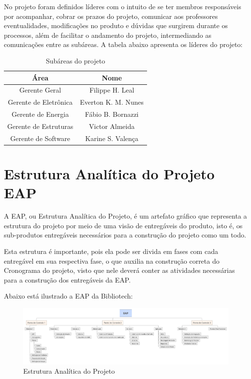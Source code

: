 No projeto foram definidos líderes com o intuito de se ter membros responsáveis por acompanhar, cobrar os prazos do projeto, comunicar aos professores eventualidades, modificações no produto e dúvidas que surgirem durante os processos, além de facilitar o andamento do projeto, intermediando as comunicações entre as subáreas. A tabela abaixo apresenta os líderes do projeto:

\begin{table}[h]
\caption{Subáreas do projeto}
\centering
\begin{tabular}{|c|c|} \hline
\textbf{Área} & \textbf{Nome}\\ \hline                               
Gerente Geral & Filippe H. Leal\\ \hline
Gerente de Eletrônica & Everton K. M. Nunes\\ \hline
Gerente de Energia & Fábio B. Bornazzi\\ \hline
Gerente de Estruturas & Victor Almeida\\ \hline
Gerente de Software & Karine S. Valença\\ \hline
\end{tabular}
\end{table}

\section{Estrutura Analítica do Projeto EAP}
A EAP, ou Estrutura Analítica do Projeto, é um artefato gráfico que representa a estrutura do projeto por meio de uma visão de entregáveis do produto, isto é, os sub-produtos entregáveis necessários para a construção do projeto como um todo.

Esta estrutura é importante, pois ela pode ser divida em fases com cada entregável em sua respectiva fase, o que auxilia na construção correta do Cronograma do projeto, visto que nele deverá conter as atividades necessárias para a construção dos entregáveis da EAP.

Abaixo está ilustrado a EAP da Bibliotech:
\begin{figure}[!ht]
\centering
\includegraphics[scale=0.4, angle = 90]{figuras/eap}
\caption{Estrutura Analítica do Projeto}
\label{Estrutura Analítica do Projeto}
\end{figure}
\FloatBarrier


